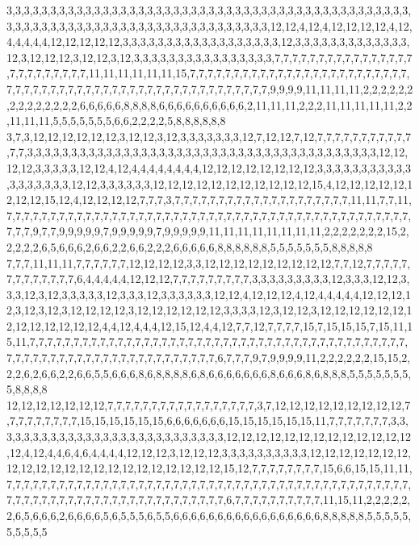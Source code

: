 3,3,3,3,3,3,3,3,3,3,3,3,3,3,3,3,3,3,3,3,3,3,3,3,3,3,3,3,3,3,3,3,3,3,3,3,3,3,3,3,3,3,3,3,3,3,3,3,3,3,3,3,3,3,3,3,3,3,3,3,3,3,3,3,3,3,3,3,3,3,3,3,3,3,3,3,12,12,4,12,4,12,12,12,12,4,12,4,4,4,4,4,12,12,12,12,12,3,3,3,3,3,3,3,3,3,3,3,3,3,3,3,3,3,3,12,3,3,3,3,3,3,3,3,3,3,3,3,3,12,3,12,12,12,3,12,12,3,12,3,3,3,3,3,3,3,3,3,3,3,3,3,3,3,3,7,7,7,7,7,7,7,7,7,7,7,7,7,7,7,7,7,7,7,7,7,7,7,7,7,11,11,11,11,11,11,15,7,7,7,7,7,7,7,7,7,7,7,7,7,7,7,7,7,7,7,7,7,7,7,7,7,7,7,7,7,7,7,7,7,7,7,7,7,7,7,7,7,7,7,7,7,7,7,7,7,7,7,7,7,7,7,9,9,9,9,11,11,11,11,2,2,2,2,2,2,2,2,2,2,2,2,2,2,6,6,6,6,6,8,8,8,8,6,6,6,6,6,6,6,6,6,6,2,11,11,11,2,2,2,11,11,11,11,11,2,2,11,11,11,5,5,5,5,5,5,5,6,6,2,2,2,2,5,8,8,8,8,8,8
3,7,3,12,12,12,12,12,12,3,12,12,3,12,3,3,3,3,3,3,3,12,7,12,12,7,12,7,7,7,7,7,7,7,7,7,7,7,7,7,3,3,3,3,3,3,3,3,3,3,3,3,3,3,3,3,3,3,3,3,3,3,3,3,3,3,3,3,3,3,3,3,3,3,3,3,3,3,3,3,12,12,12,12,3,3,3,3,3,12,12,4,12,4,4,4,4,4,4,4,4,12,12,12,12,12,12,12,12,3,3,3,3,3,3,3,3,3,3,3,3,3,3,3,3,3,3,12,12,3,3,3,3,3,3,12,12,12,12,12,12,12,12,12,12,12,15,4,12,12,12,12,12,12,12,12,15,12,4,12,12,12,12,7,7,7,3,7,7,7,7,7,7,7,7,7,7,7,7,7,7,7,7,7,7,7,7,11,11,7,7,11,7,7,7,7,7,7,7,7,7,7,7,7,7,7,7,7,7,7,7,7,7,7,7,7,7,7,7,7,7,7,7,7,7,7,7,7,7,7,7,7,7,7,7,7,7,7,7,7,7,9,7,7,9,9,9,9,9,7,9,9,9,9,9,7,9,9,9,9,9,11,11,11,11,11,11,11,11,2,2,2,2,2,2,2,15,2,2,2,2,2,6,5,6,6,6,2,6,6,2,2,6,6,2,2,2,6,6,6,6,6,8,8,8,8,8,8,5,5,5,5,5,5,5,8,8,8,8,8
7,7,7,11,11,11,7,7,7,7,7,7,12,12,12,12,3,3,12,12,12,12,12,12,12,12,12,7,7,12,7,7,7,7,7,7,7,7,7,7,7,7,7,6,4,4,4,4,4,12,12,12,7,7,7,7,7,7,7,7,7,3,3,3,3,3,3,3,3,3,12,3,3,3,12,12,3,3,3,12,3,12,3,3,3,3,3,12,3,3,3,12,3,3,3,3,3,3,12,12,4,12,12,12,4,12,4,4,4,4,4,12,12,12,12,3,12,3,12,3,12,12,12,12,3,12,12,12,12,12,12,3,3,3,3,12,3,12,12,3,12,12,12,12,12,12,12,12,12,12,12,12,12,4,4,12,4,4,4,12,15,12,4,4,12,7,7,12,7,7,7,7,15,7,15,15,15,7,15,11,15,11,7,7,7,7,7,7,7,7,7,7,7,7,7,7,7,7,7,7,7,7,7,7,7,7,7,7,7,7,7,7,7,7,7,7,7,7,7,7,7,7,7,7,7,7,7,7,7,7,7,7,7,7,7,7,7,7,7,7,7,7,7,7,7,7,7,7,7,6,7,7,7,9,7,9,9,9,9,11,2,2,2,2,2,2,15,15,2,2,2,6,2,6,6,2,2,6,6,5,5,6,6,6,8,6,8,8,8,8,6,8,6,6,6,6,6,6,6,8,6,6,6,8,6,8,8,8,5,5,5,5,5,5,5,5,8,8,8,8
12,12,12,12,12,12,12,7,7,7,7,7,7,7,7,7,7,7,7,7,7,7,7,7,3,7,12,12,12,12,12,12,12,12,12,7,7,7,7,7,7,7,7,7,15,15,15,15,15,15,6,6,6,6,6,6,6,15,15,15,15,15,15,11,7,7,7,7,7,7,7,3,3,3,3,3,3,3,3,3,3,3,3,3,3,3,3,3,3,3,3,3,3,3,3,3,3,3,12,12,12,12,12,12,12,12,12,12,12,12,12,12,4,12,4,4,6,4,6,4,4,4,4,12,12,12,3,12,12,12,3,3,3,3,3,3,3,3,3,3,12,12,12,12,12,12,12,12,12,12,12,12,12,12,12,12,12,12,12,12,12,12,15,12,7,7,7,7,7,7,7,7,15,6,6,15,15,11,11,7,7,7,7,7,7,7,7,7,7,7,7,7,7,7,7,7,7,7,7,7,7,7,7,7,7,7,7,7,7,7,7,7,7,7,7,7,7,7,7,7,7,7,7,7,7,7,7,7,7,7,7,7,7,7,7,7,7,7,7,7,7,7,7,7,7,7,7,7,7,7,6,7,7,7,7,7,7,7,7,7,7,11,15,11,2,2,2,2,2,2,6,5,6,6,6,2,6,6,6,6,5,6,5,5,5,6,5,5,6,6,6,6,6,6,6,6,6,6,6,6,6,6,6,6,6,8,8,8,8,8,5,5,5,5,5,5,5,5,5,5
